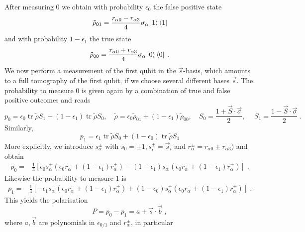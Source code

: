 \documentclass[a4paper,twocolumn,11pt, accepted=2024-06-14]{quantumarticle}
\begin{document}
After measuring $0$ we obtain with probability $\epsilon_0$  the false positive state
\begin{equation}
	\tilde \rho_{01}=\frac{r_{\alpha0}-r_{\alpha3}}{4} \sigma_\alpha \ket{1}\bra{1}
\end{equation}
and with probability $1-\epsilon_1$ the true state
\begin{equation}
	\tilde \rho_{00}=\frac{r_{\alpha0}+r_{\alpha3}}{4} \sigma_\alpha \ket{0}\bra{0}\;.
\end{equation}
We now perform a measurement of the first qubit in the $\vec s$-basis, which amounts to a full tomography of the first qubit, if we choose several different bases $\vec s$. The probability to measure $0$ is given again by a combination of true and false positive outcomes and reads
\begin{equation}
	p_0=\epsilon_0 \operatorname{tr} \tilde \rho S_1  +(1-\epsilon_1) \operatorname{tr} \tilde \rho S_0  , \quad \tilde \rho=\epsilon_0 \tilde \rho_{01}+(1-\epsilon_1) \tilde \rho_{00} , \quad S_0=\frac{1+\vec S \cdot \vec \sigma}{2}, \;\quad S_1=\frac{1-\vec S \cdot \vec \sigma}{2}\;.
	\end{equation} 
	Similarly,
	\begin{equation}
		p_1=\epsilon_1 \operatorname{tr} \tilde \rho S_0 + (1-\epsilon_0)\operatorname{tr} \tilde \rho S_1
	\end{equation}
	More explicitly, we introduce $s^\pm_\alpha$ with $s_0=\pm 1, s^\pm_i=\vec s_i$ and $r_\alpha^\pm=r_{\alpha0}\pm r_{\alpha 3})$ and obtain
\begin{equation}
\begin{aligned}
p_0=&	\frac{1}{4} [\epsilon_0s^+_\alpha (\epsilon_0r^-_{\alpha}+(1-\epsilon_1)r^+_{\alpha})  
-(1-\epsilon_1) s^-_\alpha(\epsilon_0r^-_{\alpha}+(1-\epsilon_1)r^+_{\alpha})  ]\;.
\end{aligned}
\end{equation}
Likewise the probability to measure $1$ is
\begin{equation}
\begin{aligned}
p_1=&	\frac{1}{4} [-\epsilon_1 s^-_\alpha(\epsilon_0r^-_{\alpha}+(1-\epsilon_1)r^+_{\alpha})
+(1-\epsilon_0) s^+_\alpha (\epsilon_0r^-_{\alpha}+(1-\epsilon_1)r^+_{\alpha})   ]\;.
\end{aligned}
\end{equation}
This yields the polarisation 
\begin{equation}
	P=p_0-p_1= a+ \vec s \cdot \vec b \;,
\end{equation}
where $a,\vec b$ are polynomials in $\epsilon_{0/1}$ and $r_\alpha^\pm$, in particular
\end{document}
